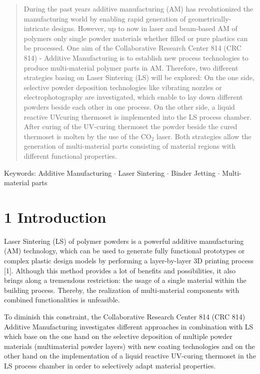 \documentclass[10pt]{article}
\begin{document}
\begin{abstract}
During the past years additive manufacturing (AM) has revolutionized the manufacturing world by enabling rapid generation of geometrically-intricate designs. However, up to now in laser and beam-based AM of polymers only single powder materials whether filled or pure plastics can be processed. One aim of the Collaborative Research Center 814 (CRC 814) - Additive Manufacturing is to establish new process technologies to produce multi-material polymer parts in AM. Therefore, two different strategies basing on Laser Sintering (LS) will be explored: On the one side, selective powder deposition technologies like vibrating nozzles or electrophotography are investigated, which enable to lay down different powders beside each other in one process. On the other side, a liquid reactive UVcuring thermoset is implemented into the LS process chamber. After curing of the UV-curing thermoset the powder beside the cured thermoset is molten by the use of the $\mathrm{CO}_{2}$ laser. Both strategies allow the generation of multi-material parts consisting of material regions with different functional properties.
\end{abstract}

Keywords: Additive Manufacturing $\cdot$ Laser Sintering $\cdot$ Binder Jetting $\cdot$ Multi-material parts

\section*{1 Introduction}
Laser Sintering (LS) of polymer powders is a powerful additive manufacturing (AM) technology, which can be used to generate fully functional prototypes or complex plastic design models by performing a layer-by-layer 3D printing process [1]. Although this method provides a lot of benefits and possibilities, it also brings along a tremendous restriction: the usage of a single material within the building process. Thereby, the realization of multi-material components with combined functionalities is unfeasible.

To diminish this constraint, the Collaborative Research Center 814 (CRC 814) Additive Manufacturing investigates different approaches in combination with LS which base on the one hand on the selective deposition of multiple powder materials (multimaterial powder layers) with new coating technologies and on the other hand on the implementation of a liquid reactive UV-curing thermoset in the LS process chamber in order to selectively adapt material properties.
\end{document}
